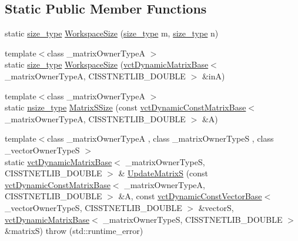 \subsection*{Static Public Member Functions}
\begin{DoxyCompactItemize}
\item 
static \hyperlink{classnmr_s_v_d_dynamic_data_ae1d183124f1fe39da05af9cea168101d}{size\+\_\+type} \hyperlink{classnmr_s_v_d_dynamic_data_a26c2eb67f4481c071e7683998aef3799}{Workspace\+Size} (\hyperlink{classnmr_s_v_d_dynamic_data_ae1d183124f1fe39da05af9cea168101d}{size\+\_\+type} m, \hyperlink{classnmr_s_v_d_dynamic_data_ae1d183124f1fe39da05af9cea168101d}{size\+\_\+type} n)
\item 
{\footnotesize template$<$class \+\_\+matrix\+Owner\+Type\+A $>$ }\\static \hyperlink{classnmr_s_v_d_dynamic_data_ae1d183124f1fe39da05af9cea168101d}{size\+\_\+type} \hyperlink{classnmr_s_v_d_dynamic_data_a9dd6679bb22385b00165277c4e866fb5}{Workspace\+Size} (\hyperlink{classvct_dynamic_matrix_base}{vct\+Dynamic\+Matrix\+Base}$<$ \+\_\+matrix\+Owner\+Type\+A, C\+I\+S\+S\+T\+N\+E\+T\+L\+I\+B\+\_\+\+D\+O\+U\+B\+L\+E $>$ \&in\+A)
\item 
{\footnotesize template$<$class \+\_\+matrix\+Owner\+Type\+A $>$ }\\static \hyperlink{classnmr_s_v_d_dynamic_data_a3673bb17448a97213388b41ce36ef5b0}{nsize\+\_\+type} \hyperlink{classnmr_s_v_d_dynamic_data_a249bc6db62dbf3336f447f309ac05c7f}{Matrix\+S\+Size} (const \hyperlink{classvct_dynamic_const_matrix_base}{vct\+Dynamic\+Const\+Matrix\+Base}$<$ \+\_\+matrix\+Owner\+Type\+A, C\+I\+S\+S\+T\+N\+E\+T\+L\+I\+B\+\_\+\+D\+O\+U\+B\+L\+E $>$ \&A)
\item 
{\footnotesize template$<$class \+\_\+matrix\+Owner\+Type\+A , class \+\_\+matrix\+Owner\+Type\+S , class \+\_\+vector\+Owner\+Type\+S $>$ }\\static \hyperlink{classvct_dynamic_matrix_base}{vct\+Dynamic\+Matrix\+Base}$<$ \+\_\+matrix\+Owner\+Type\+S, C\+I\+S\+S\+T\+N\+E\+T\+L\+I\+B\+\_\+\+D\+O\+U\+B\+L\+E $>$ \& \hyperlink{classnmr_s_v_d_dynamic_data_a293914bccd0068243631c34d38089f94}{Update\+Matrix\+S} (const \hyperlink{classvct_dynamic_const_matrix_base}{vct\+Dynamic\+Const\+Matrix\+Base}$<$ \+\_\+matrix\+Owner\+Type\+A, C\+I\+S\+S\+T\+N\+E\+T\+L\+I\+B\+\_\+\+D\+O\+U\+B\+L\+E $>$ \&A, const \hyperlink{classvct_dynamic_const_vector_base}{vct\+Dynamic\+Const\+Vector\+Base}$<$ \+\_\+vector\+Owner\+Type\+S, C\+I\+S\+S\+T\+N\+E\+T\+L\+I\+B\+\_\+\+D\+O\+U\+B\+L\+E $>$ \&vector\+S, \hyperlink{classvct_dynamic_matrix_base}{vct\+Dynamic\+Matrix\+Base}$<$ \+\_\+matrix\+Owner\+Type\+S, C\+I\+S\+S\+T\+N\+E\+T\+L\+I\+B\+\_\+\+D\+O\+U\+B\+L\+E $>$ \&matrix\+S)  throw (std\+::runtime\+\_\+error)
\end{DoxyCompactItemize}
